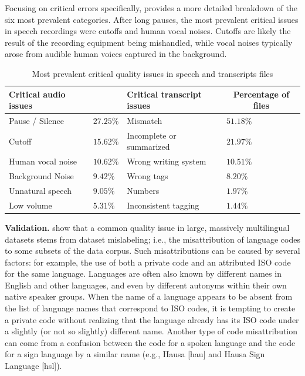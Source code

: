 \documentclass[]{fairmeta}
\begin{document}
Focusing on critical errors specifically,  provides a more detailed breakdown of the six most prevalent categories. After long pauses, the most prevalent critical issues in speech recordings were cutoffs and human vocal noises. Cutoffs are likely the result of the recording equipment being mishandled, while vocal noises typically arose from audible human voices captured in the background.

\begin{table}[!ht]
    \centering
    \begin{tabular}{p{4cm}>{\raggedleft}p{3cm}p{4cm}p{3cm}}
\toprule
\multicolumn{1}{l}{\textbf{\small{Critical audio issues}}} & \multicolumn{1}{c}{\textbf{\small{Percentage of files}}} & \multicolumn{1}{l}{\textbf{\small{Critical transcript issues}}} & \multicolumn{1}{c}{\textbf{\small{Percentage of files}}} \\
\midrule
\small{Pause / Silence} & $27.25\%$ & \small{Mismatch} & $51.18\%$ \\
\small{Cutoff} & $15.62\%$ & \small{Incomplete or summarized} & $21.97\%$ \\
\small{Human vocal noise} & $10.62\%$ & \small{Wrong writing system} & $10.51\%$ \\
\small{Background Noise} & $9.42\%$ & \small{Wrong tags} & $8.20\%$ \\
\small{Unnatural speech} & $9.05\%$ & \small{Numbers} & $1.97\%$ \\
\small{Low volume} & $5.31\%$ & \small{Inconsistent tagging} & $1.44\%$ \\
\bottomrule
    \end{tabular}
    \caption{Most prevalent critical quality issues in speech and transcripts files}
    \label{tab:qa_results}
\end{table}

\textbf{Validation.}
\citet{kreutzer2022quality} show that a common quality issue in large, massively multilingual datasets stems from dataset mislabeling; i.e., the misattribution of language codes to some subsets of the data corpus. Such misattributions can be caused by several factors: for example, the use of both a private code and an attributed ISO code for the same language. Languages are often also known by different names in English and other languages, and even by different autonyms within their own native speaker groups. When the name of a language appears to be absent from the list of language names that correspond to ISO codes, it is tempting to create a private code without realizing that the language already has its ISO code under a slightly (or not so slightly) different name. Another type of code misattribution can come from a confusion between the code for a spoken language and the code for a sign language by a similar name (e.g., Hausa [hau] and Hausa Sign Language [hsl]).
\end{document}
